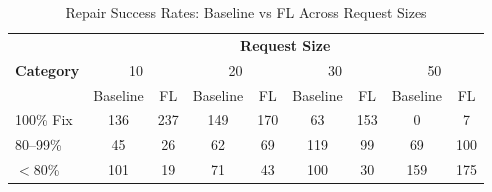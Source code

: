 \begin{table*}[t]
\centering
\caption{Repair Success Rates: Baseline vs FL Across Request Sizes}
\label{tab:repair_transposed}
\footnotesize
\setlength{\tabcolsep}{5pt}
\begin{tabular}{lcccccccc}
\toprule
& \multicolumn{8}{c}{\textbf{Request Size}} \\
\cmidrule(lr){2-9}
\textbf{Category} & \multicolumn{2}{c}{10} & \multicolumn{2}{c}{20} & \multicolumn{2}{c}{30} & \multicolumn{2}{c}{50} \\
\cmidrule(lr){2-9}
  & Baseline & FL & Baseline & FL & Baseline & FL & Baseline & FL \\
\midrule
100\% Fix & 136 & 237 & 149 & 170 & 63 & 153 & 0 & 7 \\
80--99\% & 45 & 26 & 62 & 69 & 119 & 99 & 69 & 100 \\
$<$80\% & 101 & 19 & 71 & 43 & 100 & 30 & 159 & 175 \\
\bottomrule
\end{tabular}
\end{table*}
